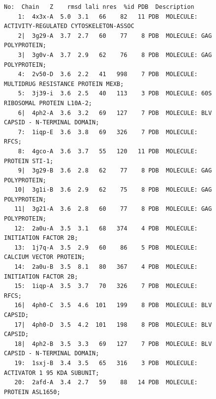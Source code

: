 \documentclass[12pt]{article}
\newcommand{\3}{$3_{10}$}
\begin{document}
\begin{figure}
\centering
\begin{singlespace}
\begin{tiny}
\begin{Verbatim}[frame=single]
   No:  Chain   Z    rmsd lali nres  %id PDB  Description
    1:  4x3x-A  5.0  3.1   66    82   11 PDB  MOLECULE: ACTIVITY-REGULATED CYTOSKELETON-ASSOC
    2|  3g29-A  3.7  2.7   60    77    8 PDB  MOLECULE: GAG POLYPROTEIN;                                           
    3|  3g0v-A  3.7  2.9   62    76    8 PDB  MOLECULE: GAG POLYPROTEIN;                                           
    4:  2v50-D  3.6  2.2   41   998    7 PDB  MOLECULE: MULTIDRUG RESISTANCE PROTEIN MEXB;                         
    5:  3j39-i  3.6  2.5   40   113    3 PDB  MOLECULE: 60S RIBOSOMAL PROTEIN L10A-2;                              
    6|  4ph2-A  3.6  3.2   69   127    7 PDB  MOLECULE: BLV CAPSID - N-TERMINAL DOMAIN;                            
    7:  1iqp-E  3.6  3.8   69   326    7 PDB  MOLECULE: RFCS;                                                      
    8:  4gco-A  3.6  3.7   55   120   11 PDB  MOLECULE: PROTEIN STI-1;                                             
    9|  3g29-B  3.6  2.8   62    77    8 PDB  MOLECULE: GAG POLYPROTEIN;                                           
   10|  3g1i-B  3.6  2.9   62    75    8 PDB  MOLECULE: GAG POLYPROTEIN;                                           
   11|  3g21-A  3.6  2.8   60    77    8 PDB  MOLECULE: GAG POLYPROTEIN;                                           
   12:  2a0u-A  3.5  3.1   68   374    4 PDB  MOLECULE: INITIATION FACTOR 2B;                                      
   13:  1j7q-A  3.5  2.9   60    86    5 PDB  MOLECULE: CALCIUM VECTOR PROTEIN;                                    
   14:  2a0u-B  3.5  8.1   80   367    4 PDB  MOLECULE: INITIATION FACTOR 2B;                                      
   15:  1iqp-A  3.5  3.7   70   326    7 PDB  MOLECULE: RFCS;                                                      
   16|  4ph0-C  3.5  4.6  101   199    8 PDB  MOLECULE: BLV CAPSID;                                                
   17|  4ph0-D  3.5  4.2  101   198    8 PDB  MOLECULE: BLV CAPSID;                                                
   18|  4ph2-B  3.5  3.3   69   127    7 PDB  MOLECULE: BLV CAPSID - N-TERMINAL DOMAIN;                            
   19:  1sxj-B  3.4  3.5   65   316    3 PDB  MOLECULE: ACTIVATOR 1 95 KDA SUBUNIT;                                
   20:  2afd-A  3.4  2.7   59    88   14 PDB  MOLECULE: PROTEIN ASL1650;                                           

\end{Verbatim}
\end{tiny}
\end{singlespace}
\end{figure}
\end{document}

